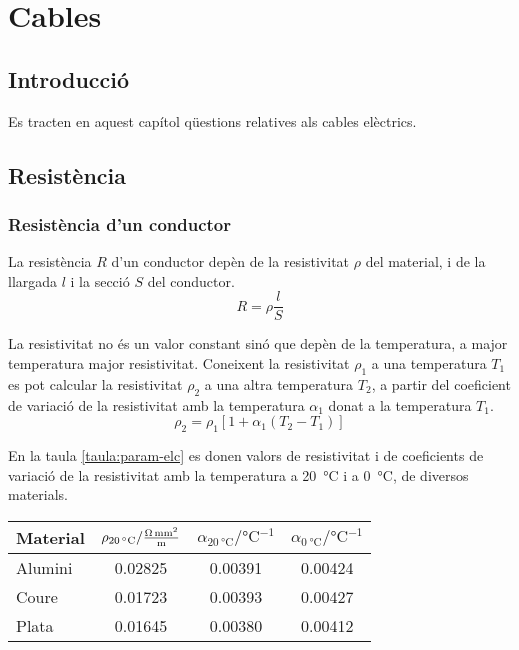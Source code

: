 \chapter{Cables}\label{sec:ch-cables}

\section{Introducció}
Es tracten en aquest capítol qüestions relatives als cables elèctrics.

\section{Resistència}

\subsection{Resistència d'un conductor}

La resistència $R$ d'un conductor depèn de la resistivitat $\rho$
del material, i de la llargada $l$ i  la secció
$S$  del conductor.
\begin{equation}
   R= \rho \frac{l}{S}
\end{equation}
\index{$\rho$}

La resistivitat no
és un valor constant sinó que depèn de la temperatura, a major
temperatura major resistivitat. Coneixent la resistivitat $\rho_1$ a una
temperatura $T_1$ es pot calcular la resistivitat $\rho_2$ a una altra
temperatura $T_2$, a partir del coeficient de variació de la
resistivitat amb la temperatura $\alpha_1$ donat a la temperatura $T_1$.
\begin{equation}
   \rho_2 = \rho_1 [1 + \alpha_1 (T_2 - T_1)]\label{eq:resistivitat}
\end{equation}
\index{$\alpha$}

En la taula
\vref{taula:param-elc} es donen valors de resistivitat i de
coeficients de variació de la resistivitat amb la temperatura a
\qty{20}{\degreeCelsius} i a \qty{0}{\degreeCelsius}, de diversos materials.

\begin{center}
   \label{taula:param-elc}
   \begin{tabular}{lccc}
   \toprule[1pt]
   Material & $\rho_{\qty{20}{\degreeCelsius}} / \unit[per-mode = fraction]{\ohm\milli\metre\squared\per\metre}$ & $\alpha_{\qty{20}{\degreeCelsius}} / \unit{\degreeCelsius^{-1}}$ &
   $\alpha_{\qty{0}{\degreeCelsius}} / \unit{\degreeCelsius^{-1}}$
   \\
   \midrule
      Alumini & \num{0,02825} & \num{0,00391} & \num{0,00424} \\
      Coure   & \num{0,01723} & \num{0,00393} & \num{0,00427} \\
      Plata   & \num{0,01645} & \num{0,00380} & \num{0,00412} \\
   \bottomrule[1pt]
   \end{tabular}
\end{center}

